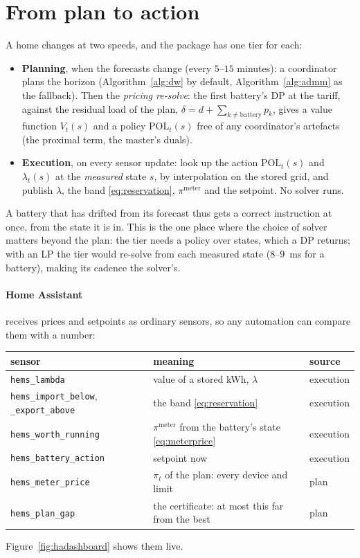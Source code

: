 \documentclass[11pt,a4paper]{article}
\begin{document}
\section{From plan to action}
\label{sec:execution}

A home changes at two speeds, and the package has one tier for each:
\begin{itemize}[leftmargin=*,itemsep=2pt]
\item \textbf{Planning}, when the forecasts change (every $5$--$15$ minutes):
  a coordinator plans the horizon (Algorithm~\ref{alg:dw} by default,
  Algorithm~\ref{alg:admm} as the fallback). Then the \emph{pricing re-solve}:
  the first battery's DP at the tariff, against the residual load of the plan,
  $\delta = d + \sum_{k \ne \text{battery}} p_k$, gives a value function
  $V_t(s)$ and a policy $\mathrm{POL}_t(s)$ free of any coordinator's
  artefacts (the proximal term, the master's duals).
\item \textbf{Execution}, on every sensor update: look up the action
  $\mathrm{POL}_t(s)$ and $\lambda_t(s)$ at the \emph{measured} state $s$, by
  interpolation on the stored grid, and publish $\lambda$, the band
  \eqref{eq:reservation}, $\pi^{\mathrm{meter}}$ and the setpoint. No solver
  runs.
\end{itemize}
A battery that has drifted from its forecast thus gets a correct instruction at
once, from the state it is in. This is the one place where the choice of solver
matters beyond the plan: the tier needs a policy over states, which a DP returns;
with an LP the tier would re-solve from each measured state ($8$--$9$~ms for a
battery), making its cadence the solver's.

\paragraph{Home Assistant} receives prices and setpoints as ordinary sensors,
so any automation can compare them with a number:
\begin{center}
\small
\begin{tabular}{@{}lll@{}}
\toprule
sensor & meaning & source \\
\midrule
\texttt{hems\_lambda} & value of a stored kWh, $\lambda$ & execution \\
\texttt{hems\_import\_below}, \texttt{\_export\_above} & the band \eqref{eq:reservation} & execution \\
\texttt{hems\_worth\_running} & $\pi^{\mathrm{meter}}$ from the battery's state \eqref{eq:meterprice} & execution \\
\texttt{hems\_battery\_action} & setpoint now & execution \\
\texttt{hems\_meter\_price} & $\pi_t$ of the plan: every device and limit & plan \\
\texttt{hems\_plan\_gap} & the certificate: at most this far from the best & plan \\
\bottomrule
\end{tabular}
\end{center}
Figure~\ref{fig:hadashboard} shows them live.
\end{document}
